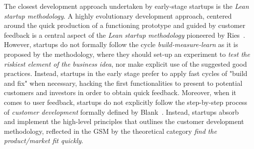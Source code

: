 \documentclass[10pt,journal,letterpaper,compsoc]{IEEEtran}
\begin{document}
The closest development approach undertaken by early-stage startups is the
\textit{Lean startup methodology}. A highly evolutionary development approach,
centered around the quick production of a functioning prototype and guided by
customer feedback is a central aspect of the \textit{Lean startup methodology}
pioneered by Ries~\cite{Ries2011}. However, startups do not formally follow the
cycle \textit{build-measure-learn} as it is proposed by the methodology, where
they should set-up an experiment to \textit{test the riskiest element of the
business idea}, nor make explicit use of the suggested good practices. Instead,
startups in the early stage prefer to apply fast cycles of "build and fix"
when necessary, hacking the first functionalities to present to potential
customers and investors in order to obtain quick feedback. 
Moreover, when it comes to user feedback, startups do not explicitly follow 
the step-by-step process of \textit{customer development} formally defined by 
Blank~\cite{Blank2005}. Instead, startups absorb and implement the high-level
principles that outlines the customer development methodology, reflected in the 
GSM by the theoretical category \textit{find the product/market fit quickly}.


\end{document}
